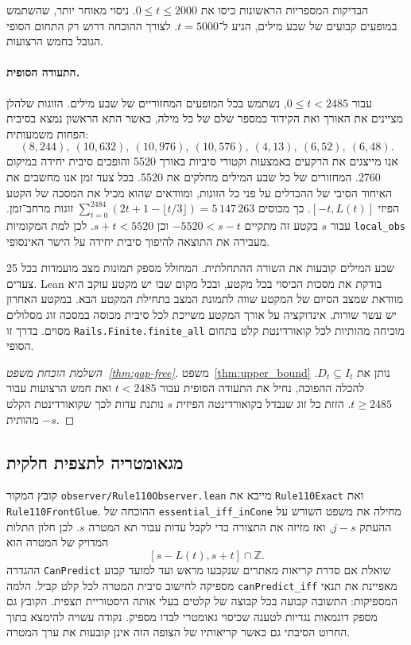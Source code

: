 \documentclass[11pt,a4paper]{article}
\DeclareRobustCommand{\textenglish}[1]{\foreignlanguage{english}{#1}}
\theoremstyle{definition}
\begin{document}
הבדיקות המספריות הראשונות כיסו את $0\le t\le2000$. ניסוי מאוחר יותר, שהשתמש במופעים קבועים של שבע מילים, הגיע ל־$t=5000$. לצורך ההוכחה דרוש רק התחום הסופי הגובל בחמש הרצועות.

\paragraph{התעודה הסופית.}
עבור $0\le t<2485$, נשתמש בכל המופעים המחזוריים של שבע מילים. הזוגות שלהלן מציינים את האורך ואת הקידוד כמספר שלם של כל מילה, כאשר התא הראשון נמצא בסיבית הפחות משמעותית:
\[
(8,244),\ (10,632),\ (10,976),\ (10,576),\ (4,13),\ (6,52),\ (6,48).
\]
אנו מייצגים את הרקעים באמצעות וקטורי סיביות באורך 5520 והופכים סיבית יחידה במיקום 2760. המחזורים של כל שבע המילים מחלקים את 5520. בכל צעד זמן אנו מחשבים את האיחוד הסיבי של ההבדלים על פני כל הזוגות, ומוודאים שהוא מכיל את המסכה של הקטע הפיזי $[-t,L(t)]$. כך מכוסים $\sum_{t=0}^{2484}(2t+1-\lfloor t/3\rfloor)=5\,147\,263$ זוגות מרחב־זמן. עבור $s$ בקטע זה מתקיים $-5520<s-t$ וכן $s+t<5520$. לכן למת המקומיות \textenglish{\texttt{local\_obs}} מעבירה את התוצאה להיפוך סיבית יחידה על הישר האינסופי.

שבע המילים קובעות את השורה ההתחלתית. המחולל מספק תמונות מצב מועמדות בכל 25 צעדים. \textenglish{Lean} בודקת את מסכות הכיסוי בכל מקטע, ובכל מקום שבו יש מקטע עוקב היא מוודאת שמצב הסיום של המקטע שווה לתמונת המצב בתחילת המקטע הבא. במקטע האחרון יש עשר שורות. אינדוקציה על אורך המקטע משייכת לכל סיבית מכוסה במסכה זוג מסלולים מסוים. בדרך זו \textenglish{\texttt{Rails.Finite.finite\_all}} מוכיחה מהותיות לכל קואורדינטת קלט בתחום הסופי.

\begin{proof}[השלמת הוכחת משפט~\ref{thm:gap-free}]
משפט~\ref{thm:upper_bound} נותן את $D_t\subseteq I_t$. להכלה ההפוכה, נחיל את התעודה הסופית עבור $t<2485$ ואת חמש הרצועות עבור $t\ge2485$. הזזת כל זוג שנבדל בקואורדינטה הפיזית $s$ נותנת עדות לכך שקואורדינטת הקלט $-s$ מהותית.
\end{proof}

\subsection{מגאומטריה לתצפית חלקית}
קובץ המקור \textenglish{\texttt{observer/Rule110Observer.lean}} מייבא את \textenglish{\texttt{Rule110Exact}} ואת \textenglish{\texttt{Rule110FrontGlue}}. ההוכחה של \textenglish{\texttt{essential\_iff\_inCone}} מחילה את משפט השורש על ההעתק $j-s$, ואז מזיזה את התצורה כדי לקבל עדות עבור תא המטרה $s$. לכן חלון התלות המדויק של המטרה הוא
\[
  [s-L(t),s+t]\cap\mathbb Z.
\]
ההגדרה \textenglish{\texttt{CanPredict}} שואלת אם סדרת קריאות מאתרים שנקבעו מראש ועד למועד קבוע מספיקה לחישוב סיבית המטרה לכל קלט קביל. הלמה \textenglish{\texttt{canPredict\_iff}} מאפיינת את תנאי המספיקות: התשובה קבועה בכל קבוצה של קלטים בעלי אותה היסטוריית תצפית. הקובץ גם מספק דוגמאות נגדיות לטענה שכיסוי גאומטרי לבדו מספיק. נקודה עשויה להימצא בתוך החרוט הסיבתי גם כאשר קריאותיו של הצופה הזה אינן קובעות את ערך המטרה.
\end{document}
